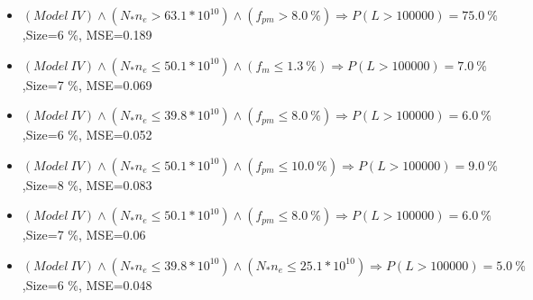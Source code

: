 \documentclass[numbered]{CSL}
\begin{document}
\begin{itemize}
\item $(Model~IV) \land (N_* n_e > 63.1 * 10^{10}) \land (f_{pm} > 8.0~\%) \Rightarrow P(L > 100 000) = 75.0~\%$,\hfill Size=6 \%, MSE=0.189
\item $(Model~IV) \land (N_* n_e \leq 50.1 * 10^{10}) \land (f_m \leq 1.3~\%) \Rightarrow P(L > 100 000) = 7.0~\%$,\hfill Size=7 \%, MSE=0.069
\item $(Model~IV) \land (N_* n_e \leq 39.8 * 10^{10}) \land (f_{pm} \leq 8.0~\%) \Rightarrow P(L > 100 000) = 6.0~\%$,\hfill Size=6 \%, MSE=0.052
\item $(Model~IV) \land (N_* n_e \leq 50.1 * 10^{10}) \land (f_{pm} \leq 10.0~\%) \Rightarrow P(L > 100 000) = 9.0~\%$,\hfill Size=8 \%, MSE=0.083
\item $(Model~IV) \land (N_* n_e \leq 50.1 * 10^{10}) \land (f_{pm} \leq 8.0~\%) \Rightarrow P(L > 100 000) = 6.0~\%$,\hfill Size=7 \%, MSE=0.06
\item $(Model~IV) \land (N_* n_e \leq 39.8 * 10^{10}) \land (N_* n_e \leq 25.1 * 10^{10}) \Rightarrow P(L > 100 000) = 5.0~\%$,\hfill Size=6 \%, MSE=0.048
\end{itemize}
\end{document}
